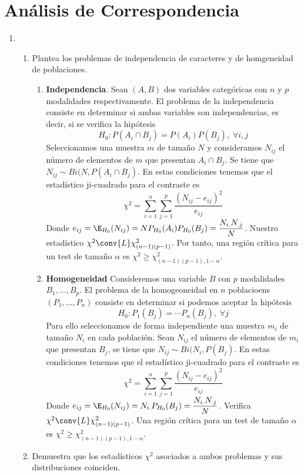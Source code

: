 \documentclass[twoside]{article}
\begin{document}
\section{Análisis de Correspondencia}
\begin{enumerate}
\item 
\begin{enumerate}
\item Plantea los problemas de independencia de caracteres y de homgeneidad de poblaciones.

\begin{enumerate}
\item[] \textbf{Independencia}. Sean $(A,B)$ dos variables categóricas con $n$ y $p$ modalidades respectivamente. El problema de la independencia consiste en determinar si ambas variables son independencias, es decir, si se verifica la hipótesis
$$
H_0\colon P(A_i\cap B_j) = P(A_i)P(B_j), \; \forall i,j
$$
Seleccionamos una muestra $m$ de tamaño $N$ y consideramos $N_{ij}$ el número de elementos de $m$ que presentan $A_i\cap B_j$. Se tiene que $N_{ij}\sim Bi(N,P(A_i\cap B_j)$. En estas condiciones tenemos que el estadístico ji-cuadrado para el contraste es
$$
\chi^2 = \sum_{i=1}^n \sum_{j=1}^p \frac{(N_{ij}-e_{ij})^2}{e_{ij}}
$$
Donde $e_{ij} = \E_{H_0}(N_{ij}) = NP_{H_0}(A_i)P_{H_0}(B_j) = \dfrac{N_{i.}N_{.j}}{N}$. Nuestro estadístico $\chi^2 \conv{L}\chi^2_{(n-1)(p-1)}$. Por tanto, una región crítica para un test de tamaño $\alpha$ es $\chi^2 \geq \chi^2_{(n-1)(p-1),1-\alpha}$.
\item[] \textbf{Homogeneidad} Consideremos una variable $B$ con $p$ modalidades $B_1,\dotsc,B_p$. El problema de la homogeoneidad en $n$ poblacioens $(P_1,\dotsc,P_n)$ consiste en determinar si podemos aceptar la hipótesis
$$
H_0\colon P_1(B_j) = \cdots P_n(B_j),\;\forall j
$$
Para ello seleccionamos de forma independiente una muestra $m_i$ de tamaño $N_i$ en cada población. Sean $N_{ij}$ el número de elementos de $m_i$ que presentan $B_j$, se tiene que $N_{ij}\sim Bi(N_i,P(B_j)$. En estas condiciones tenemos que el estadístico ji-cuadrado para el contraste es
$$
\chi^2 = \sum_{i=1}^n \sum_{j=1}^p \frac{(N_{ij}-e_{ij})^2}{e_{ij}}
$$
Donde $e_{ij} = \E_{H_0}(N_{ij}) = N_{i.}P_{H_0}(B_j) = \dfrac{N_{i.}N_{.j}}{N}$. Verifica $\chi^2 \conv{L}\chi^2_{(n-1)(p-1)}$. Una región crítica para un test de tamaño $\alpha$ es $\chi^2 \geq \chi^2_{(n-1)(p-1),1-\alpha}$.
\end{enumerate}

\item Demuestra que los estadísticos $\chi^2$ asociados a ambos problemas y sus distribuciones coinciden.


\end{enumerate}
\end{enumerate}
\end{document}

